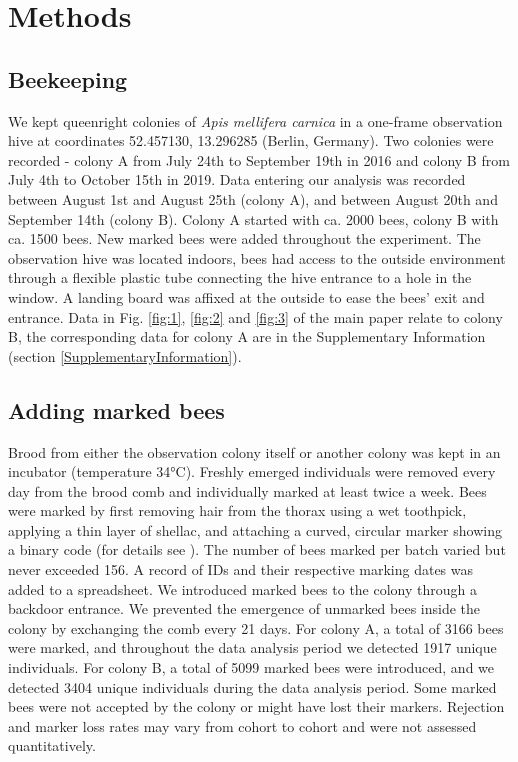 \documentclass{article}
\begin{document}
\section{Methods}

\subsection*{Beekeeping}
We kept queenright colonies of \textit{Apis mellifera carnica} in a one-frame observation hive at coordinates 52.457130, 13.296285 (Berlin, Germany). Two colonies were recorded - colony A from July 24th to September 19th in 2016 and colony B from July 4th to October 15th in 2019. Data entering our analysis was recorded between August 1st and August 25th (colony A), and between August 20th and September 14th (colony B). Colony A started with ca. 2000 bees, colony B with ca. 1500 bees. New marked bees were added throughout the experiment. The observation hive was located indoors, bees had access to the outside environment through a flexible plastic tube connecting the hive entrance to a hole in the window. A landing board was affixed at the outside to ease the bees' exit and entrance. Data in Fig. \ref{fig:1}, \ref{fig:2} and \ref{fig:3} of the main paper relate to colony B, the corresponding data for colony A are in the Supplementary Information (section \ref{SupplementaryInformation}).

\subsection*{Adding marked bees}
Brood from either the observation colony itself or another colony was kept in an incubator (temperature 34°C). Freshly emerged individuals were removed every day from the brood comb and individually marked at least twice a week. Bees were marked by first removing hair from the thorax using a wet toothpick, applying a thin layer of shellac, and attaching a curved, circular marker showing a binary code (for details see \cite{wario_automatic_2015}). The number of bees marked per batch varied but never exceeded 156. A record of IDs and their respective marking dates was added to a spreadsheet. We introduced marked bees to the colony through a backdoor entrance. We prevented the emergence of unmarked bees inside the colony by exchanging the comb every 21 days. For colony A, a total of 3166 bees were marked, and throughout the data analysis period we detected 1917 unique individuals. For colony B, a total of 5099 marked bees were introduced, and we detected 3404 unique individuals during the data analysis period. Some marked bees were not accepted by the colony or might have lost their markers. Rejection and marker loss rates may vary from cohort to cohort and were not assessed quantitatively.
\end{document}
